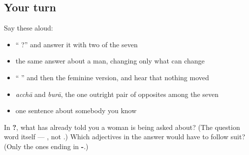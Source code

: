 \subsection*{Your turn}
Say these aloud:

\begin{itemize}
\raggedright
  \item \textquotedblleft{}  ?\textquotedblright{} and answer it with two of the seven
  \item the same answer about a man, changing only what can change
  \item \textquotedblleft{}  \textquotedblright{} and then the feminine version, and hear that nothing moved
  \item \emph{acchā} and \emph{burā}, the one outright pair of opposites among the seven
  \item one sentence about somebody you know
\end{itemize}

\begin{tcolorbox}[breakable,colback=teal!4,colframe=teal!35!black,title={Before you move on}]
In \textbf{  ?}, what has already told you a woman is being asked about? (The question word itself — \textbf{}, not \textbf{}.) Which adjectives in the answer would have to follow suit? (Only the ones ending in \textbf{-}.)
\end{tcolorbox}
